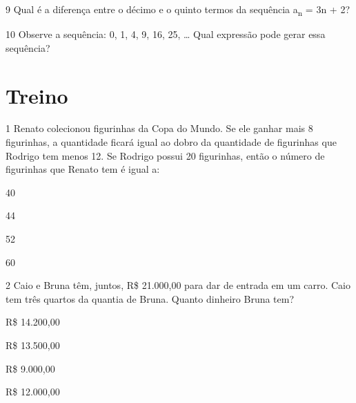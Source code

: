 \num{9} Qual é a diferença entre o décimo e o quinto termos da sequência 
a\textsubscript{n} = 3n + 2?

\begin{emptybox}
\end{emptybox}

\num{10} Observe a sequência: 0, 1, 4, 9, 16, 25, \ldots{}
Qual expressão pode gerar essa sequência?

\begin{emptybox}
\end{emptybox}

\section{Treino}

\num{1} Renato colecionou figurinhas da Copa do Mundo. Se ele ganhar mais 8
figurinhas, a quantidade ficará igual ao dobro da quantidade de figurinhas 
que Rodrigo tem menos 12. Se Rodrigo possui 20 figurinhas, então o número de
figurinhas que Renato tem é igual a:

\begin{escolha}

  \item 40

  \item 44

  \item 52

  \item 60

\end{escolha}


\num{2} Caio e Bruna têm, juntos, R\$ 21.000,00 para dar de entrada em um
carro. Caio tem três quartos da quantia de Bruna. Quanto dinheiro Bruna tem?

\begin{escolha}
  \item R\$ 14.200,00

  \item R\$ 13.500,00

  \item R\$ 9.000,00

  \item R\$ 12.000,00
\end{escolha}

